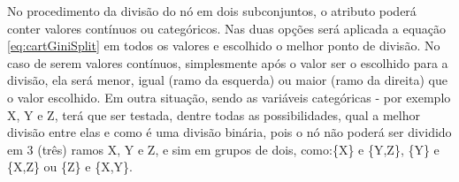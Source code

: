 

No procedimento da divisão do nó em dois subconjuntos, o atributo poderá conter valores contínuos ou categóricos. Nas duas opções será aplicada a equação \ref{eq:cartGiniSplit} em todos os valores e escolhido o melhor ponto de divisão. No caso de serem valores contínuos, simplesmente após o valor ser o escolhido para a divisão, ela será menor, igual (ramo da esquerda) ou maior (ramo da direita) que o valor escolhido. Em outra situação, sendo as variáveis categóricas - por exemplo X, Y e Z, terá que ser testada, dentre todas as possibilidades, qual a melhor divisão entre elas e como é uma divisão binária, pois o nó não poderá ser dividido em 3 (três) ramos X, Y e Z, e sim em grupos de dois, como:\{X\} e \{Y,Z\}, \{Y\} e \{X,Z\} ou \{Z\} e \{X,Y\}.


